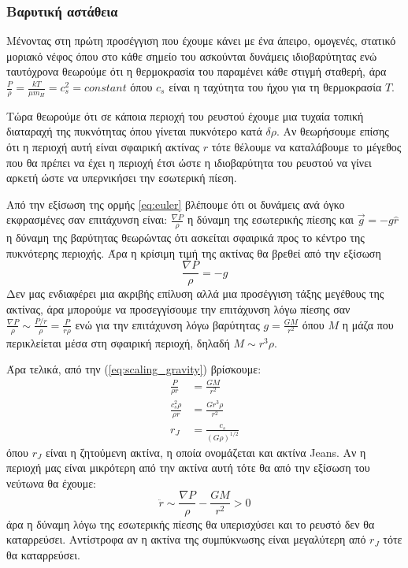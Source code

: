 \documentclass[a4paper,12pt]{memoir}
\begin{document}
\subsubsection{Βαρυτική αστάθεια}
Μένοντας στη πρώτη προσέγγιση που έχουμε κάνει με ένα άπειρο, ομογενές, στατικό μοριακό νέφος όπου στο κάθε σημείο του ασκούνται δυνάμεις ιδιοβαρύτητας ενώ ταυτόχρονα θεωρούμε ότι η θερμοκρασία του παραμένει κάθε στιγμή σταθερή, άρα $\frac{P}{\rho}=\frac{kT}{\mu m_{H}}=c_s^2=constant$ όπου $c_s$ είναι η ταχύτητα του ήχου για τη θερμοκρασία $T$.

Τώρα θεωρούμε ότι σε κάποια περιοχή του ρευστού έχουμε μια τυχαία τοπική διαταραχή της πυκνότητας όπου γίνεται πυκνότερο κατά $\delta \rho$. Αν θεωρήσουμε επίσης ότι η περιοχή αυτή είναι σφαιρική ακτίνας $r$ τότε θέλουμε να καταλάβουμε το μέγεθος που θα πρέπει να έχει η περιοχή έτσι ώστε η ιδιοβαρύτητα του ρευστού να γίνει αρκετή ώστε να υπερνικήσει την εσωτερική πίεση.

Από την εξίσωση της ορμής \ref{eq:euler} βλέπουμε ότι οι δυνάμεις ανά όγκο εκφρασμένες σαν επιτάχυνση είναι: $\frac{\nabla P}{\rho}$ η δύναμη της εσωτερικής πίεσης και $\vec{g}=-g \hat{r}$ η δύναμη της βαρύτητας θεωρώντας ότι ασκείται σφαιρικά προς το κέντρο της πυκνότερης περιοχής.
Άρα η κρίσιμη τιμή της ακτίνας θα βρεθεί από την εξίσωση
\begin{equation} 
\label{eq:scaling_gravity}
\frac{\nabla P}{\rho} =-g
\end{equation}
Δεν μας ενδιαφέρει μια ακριβής επίλυση αλλά μια προσέγγιση τάξης μεγέθους της ακτίνας, άρα μπορούμε να προσεγγίσουμε την επιτάχυνση λόγω πίεσης σαν $\frac{\nabla P}{\rho} \sim \frac{P/r}{\rho}=\frac{P}{r \rho}$ ενώ για την επιτάχυνση λόγω βαρύτητας $g=\frac{GM}{r^2}$ όπου $M$ η μάζα που περικλείεται μέσα στη σφαιρική περιοχή, δηλαδή $M \sim r^3 \rho$.

Άρα τελικά, από την (\ref{eq:scaling_gravity}) βρίσκουμε:
\begin{align}
\frac{P}{\rho r} &= \frac{GM}{r^2} \\
\frac{c_s ^2 \rho}{\rho r} &= \frac{Gr^3 \rho}{r^2} \\
r_J&=\frac{c_s}{(G \rho)^{1/2}}
\end{align}
όπου $r_{J}$ είναι η ζητούμενη ακτίνα, η οποία ονομάζεται και ακτίνα Jeans. Αν η περιοχή μας είναι μικρότερη από την ακτίνα αυτή τότε θα από την εξίσωση του νεύτωνα θα έχουμε: 
\begin{equation}
\label{eq:newton}
\ddot{r} \sim \frac{\nabla P}{\rho} -\frac{GM}{r^2} > 0
\end{equation}
άρα η δύναμη λόγω της εσωτερικής πίεσης θα υπερισχύσει και το ρευστό δεν θα καταρρεύσει. Αντίστροφα αν η ακτίνα της συμπύκνωσης είναι μεγαλύτερη από $r_J$ τότε θα καταρρεύσει.
\end{document}

